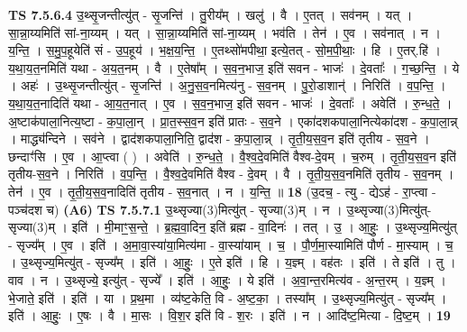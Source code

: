 \documentclass[17pt]{extarticle}
\begin{document}
                  \newline
                                \textbf{ TS 7.5.6.4} \newline
                  उ॒थ्सृ॒जन्तीत्यु॑त् - सृ॒जन्ति॑ । तु॒रीय᳚म् । खलु॑ । वै । ए॒तत् । सव॑नम् । यत् । सा॒न्ना॒य्यमिति॑ सां-ना॒य्यम् । यत् । सा॒न्ना॒य्यमिति॑ सां-ना॒य्यम् । भव॑ति । तेन॑ । ए॒व । सव॑नात् । न । य॒न्ति॒ । स॒मु॒प॒हूयेति॑ सं - उ॒प॒हूय॑ । भ॒क्ष॒य॒न्ति॒ । ए॒तथ्सो॑मपीथा॒ इत्ये॒तत् - सो॒म॒पी॒थाः॒ । हि । ए॒तर्.हि॑ । य॒था॒य॒त॒नमिति॑ यथा - अ॒य॒त॒नम् । वै । ए॒तेषा᳚म् । स॒व॒न॒भाज॒ इति॑ सवन - भाजः॑ । दे॒वताः᳚ । ग॒च्छ॒न्ति॒ । ये । अहः॑ । उ॒थ्सृ॒जन्तीत्यु॑त् - सृ॒जन्ति॑ । अ॒नु॒स॒व॒नमित्य॑नु - स॒व॒नम् । पु॒रो॒डाशान्॑ । निरिति॑ । व॒प॒न्ति॒ । य॒था॒य॒त॒नादिति॑ यथा - आ॒य॒त॒नात् । ए॒व । स॒व॒न॒भाज॒ इति॑ सवन - भाजः॑ । दे॒वताः᳚ । अवेति॑ । रु॒न्ध॒ते॒ । अ॒ष्टाक॑पाला॒नित्य॒ष्टा - क॒पा॒ला॒न् । प्रा॒त॒स्स॒व॒न इति॑ प्रातः - स॒व॒ने । एका॑दशकपाला॒नित्येका॑दश - क॒पा॒ला॒न्न् । माद्ध्य॑न्दिने । सव॑ने । द्वाद॑शकपाला॒निति॒ द्वाद॑श - क॒पा॒ला॒न्न् । तृ॒ती॒य॒स॒व॒न इति॑ तृतीय - स॒व॒ने । छन्दाꣳ॑सि । ए॒व । आ॒प्त्वा ( ) । अवेति॑ । रु॒न्ध॒ते॒ । वै॒श्व॒दे॒वमिति॑ वैश्व-दे॒वम् । च॒रुम् । तृ॒ती॒य॒स॒व॒न इति॑ तृतीय-स॒व॒ने । निरिति॑ । व॒प॒न्ति॒ । वै॒श्व॒दे॒वमिति॑ वैश्व - दे॒वम् । वै । तृ॒ती॒य॒स॒व॒नमिति॑ तृतीय - स॒व॒नम् । तेन॑ । ए॒व । तृ॒ती॒य॒स॒व॒नादिति॑ तृतीय - स॒व॒नात् । न । य॒न्ति॒ ॥ \textbf{  18} \newline
                  \newline
                      (उ॒दच॒ - त्यु - द्येऽह॑ - रा॒प्त्वा - पञ्च॑दश च)  \textbf{(A6)} \newline \newline
                                \textbf{ TS 7.5.7.1} \newline
                  उ॒थ्सृज्या(3)मित्यु॑त् - सृज्या(3)म् । न । उ॒थ्सृज्या(3)मित्यु॑त्- सृज्या(3)म् । इति॑ । मी॒माꣳ॒॒स॒न्ते॒ । ब्र॒ह्म॒वा॒दिन॒ इति॑ ब्रह्म - वा॒दिनः॑ । तत् । उ॒ । आ॒हुः॒ । उ॒थ्सृज्य॒मित्यु॑त् - सृज्य᳚म् । ए॒व । इति॑ । अ॒मा॒वा॒स्या॑या॒मित्य॑मा - वा॒स्या॑याम् । च॒ । पौ॒र्ण॒मा॒स्यामिति॑ पौर्ण - मा॒स्याम् । च॒ । उ॒थ्सृज्य॒मित्यु॑त् - सृज्य᳚म् । इति॑ । आ॒हुः॒ । ए॒ते इति॑ । हि । य॒ज्ञ्म् । वह॑तः । इति॑ । ते इति॑ । तु । वाव । न । उ॒थ्सृज्ये॒ इत्यु॑त् - सृज्ये᳚ । इति॑ । आ॒हुः॒ । ये इति॑ । अ॒वा॒न्त॒रमित्य॑व - अ॒न्त॒रम् । य॒ज्ञ्म् । भे॒जाते॒ इति॑ । इति॑ । या । प्र॒थ॒मा । व्य॑ष्ट॒केति॒ वि - अ॒ष्ट॒का॒ । तस्या᳚म् । उ॒थ्सृज्य॒मित्यु॑त् - सृज्य᳚म् । इति॑ । आ॒हुः॒ । ए॒षः । वै । मा॒सः । वि॒श॒र इति॑ वि - श॒रः । इति॑ । न । आदि॑ष्ट॒मित्या - दि॒ष्ट॒म् । \textbf{  19} \newline
                  \newline
\end{document}
